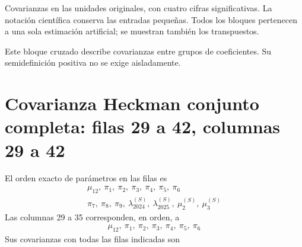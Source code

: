 \documentclass[11pt,a4paper]{article}
\begin{document}
Covarianzas en las unidades originales, con cuatro cifras significativas. La notación científica conserva las entradas pequeñas. Todos los bloques pertenecen a una sola estimación artificial; se muestran también los transpuestos.

Este bloque cruzado describe covarianzas entre grupos de coeficientes. Su semidefinición positiva no se exige aisladamente.

\clearpage
\section{Covarianza Heckman conjunto completa: filas 29 a 42, columnas 29 a 42}
El orden exacto de parámetros en las filas es
\[
\begin{gathered}\mu_12,\ \pi_1,\ \pi_2,\ \pi_3,\ \pi_4,\ \pi_5,\ \pi_6\\\pi_7,\ \pi_8,\ \pi_9,\ \lambda_{2024}^{(S)},\ \lambda_{2025}^{(S)},\ \mu_2^{(S)},\ \mu_3^{(S)}\end{gathered}
\]
Las columnas 29 a 35 corresponden, en orden, a
\[
\begin{gathered}\mu_12,\ \pi_1,\ \pi_2,\ \pi_3,\ \pi_4,\ \pi_5,\ \pi_6\end{gathered}
\]
Sus covarianzas con todas las filas indicadas son
\end{document}
